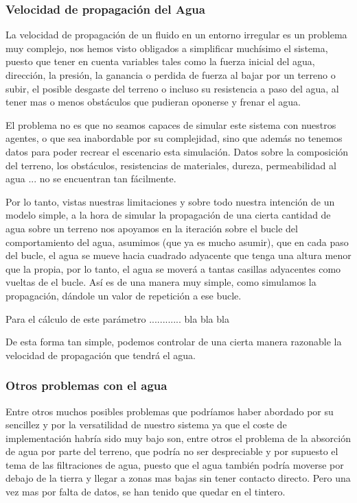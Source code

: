 \subsubsection*{Velocidad de propagación del Agua}

La velocidad de propagación de un fluido en un entorno irregular es un problema
muy complejo, nos hemos visto 
obligados a simplificar muchísimo el sistema,
puesto que tener en cuenta
variables tales como la fuerza inicial del agua, dirección, la presión, la
ganancia o perdida de fuerza al bajar por un terreno o subir, el posible
desgaste del terreno o incluso su resistencia a paso del agua, al tener mas o
menos obstáculos que pudieran oponerse y frenar el agua. 

El problema no es que no seamos capaces de simular este sistema con nuestros
agentes, o que sea inabordable por su complejidad, sino que además no tenemos 
datos para poder recrear el escenario
esta simulación. Datos sobre la composición del terreno, los obstáculos,
resistencias de materiales, dureza, permeabilidad al agua ... no se encuentran
tan fácilmente.

Por lo tanto, vistas nuestras limitaciones y sobre todo nuestra intención de un
modelo simple, a la hora de simular la propagación de una cierta cantidad de
agua sobre un terreno nos apoyamos en la iteración sobre el bucle del
comportamiento del agua, asumimos (que ya es mucho asumir), que en cada paso del
bucle, el agua se mueve hacia cuadrado adyacente que tenga una altura menor que
la propia, por lo tanto, el agua se moverá a tantas casillas adyacentes como
vueltas de el bucle. Así es de una manera muy simple, como simulamos la
propagación, dándole un valor de repetición a ese bucle.

Para el cálculo de este parámetro ............ bla bla bla %

De esta forma tan simple, podemos controlar de una cierta manera razonable la
velocidad de propagación que tendrá el agua.

\subsubsection*{Otros problemas con el agua}

Entre otros muchos posibles problemas que podríamos haber abordado por su
sencillez y por la versatilidad de nuestro sistema ya que el coste de
implementación habría sido muy bajo son, entre otros el problema de la absorción
de agua por parte del terreno, que podría no ser despreciable y por supuesto el
tema de las filtraciones de agua, puesto que el agua también podría moverse por
debajo de la tierra y llegar a zonas mas bajas sin tener contacto directo. Pero
una vez mas por falta de datos, se han tenido que quedar en el tintero.


